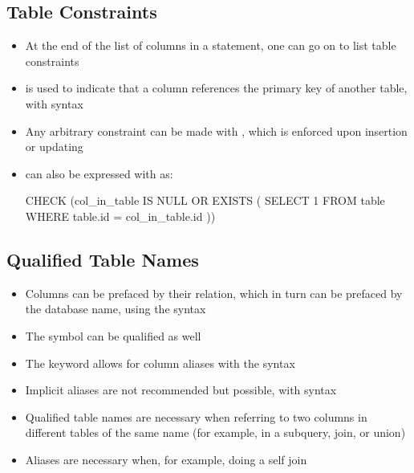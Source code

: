 \documentclass[a4paper]{article}
\begin{document}
\subsection{Table Constraints}
\begin{itemize}
    \item At the end of the list of columns in a  statement, one can go on to list table constraints
    \item {} is used to indicate that a column references the primary key of another table, with syntax 
    \item Any arbitrary constraint can be made with , which is enforced upon insertion or updating
    \item {} can also be expressed with  as:
\begin{sql}
CHECK (col_in_table IS NULL OR EXISTS (
    SELECT 1 FROM table
    WHERE table.id = col_in_table.id
))
\end{sql}
\end{itemize}

\subsection{Qualified Table Names}
\begin{itemize}
    \item Columns can be prefaced by their relation, which in turn can be prefaced by the database name, using the syntax 
    \item The \ilsql{*} symbol can be qualified as well
    \item The  keyword allows for column aliases with the syntax 
    \item Implicit aliases are not recommended but possible, with syntax 
    \item Qualified table names are necessary when referring to two columns in different tables of the same name (for example, in a subquery, join, or union)
    \item Aliases are necessary when, for example, doing a self join
\end{itemize}
\end{document}
